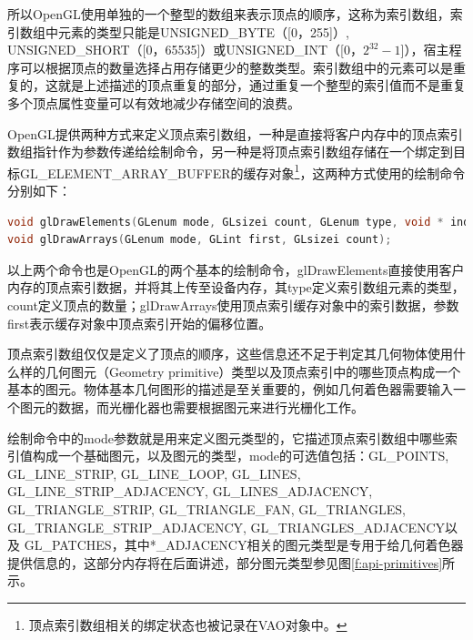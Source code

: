 所以OpenGL使用单独的一个整型的数组来表示顶点的顺序，这称为索引数组，索引数组中元素的类型只能是UNSIGNED\_BYTE（[0，255]）, UNSIGNED\_SHORT（[0，65535]）或UNSIGNED\_INT（[0，$2^{32}-1$]），宿主程序可以根据顶点的数量选择占用存储更少的整数类型。索引数组中的元素可以是重复的，这就是上述描述的顶点重复的部分，通过重复一个整型的索引值而不是重复多个顶点属性变量可以有效地减少存储空间的浪费。

OpenGL提供两种方式来定义顶点索引数组，一种是直接将客户内存中的顶点索引数组指针作为参数传递给绘制命令，另一种是将顶点索引数组存储在一个绑定到目标GL\_ELEMENT\_ARRAY\_BUFFER的缓存对象\footnote{顶点索引数组相关的绑定状态也被记录在VAO对象中。}，这两种方式使用的绘制命令分别如下：

\begin{lstlisting}[language=C++]
void glDrawElements​(GLenum mode​, GLsizei count​, GLenum type​, void * indices​);
void glDrawArrays​(GLenum mode​, GLint first​, GLsizei count​);
\end{lstlisting}

以上两个命令也是OpenGL的两个基本的绘制命令，glDrawElements直接使用客户内存的顶点索引数据，并将其上传至设备内存，其type定义索引数组元素的类型，count定义顶点的数量；glDrawArrays使用顶点索引缓存对象中的索引数据，参数first表示缓存对象中顶点索引开始的偏移位置。

顶点索引数组仅仅是定义了顶点的顺序，这些信息还不足于判定其几何物体使用什么样的几何图元（Geometry primitive）类型以及顶点索引中的哪些顶点构成一个基本的图元。物体基本几何图形的描述是至关重要的，例如几何着色器需要输入一个图元的数据，而光栅化器也需要根据图元来进行光栅化工作。

绘制命令中的mode参数就是用来定义图元类型的，它描述顶点索引数组中哪些索引值构成一个基础图元，以及图元的类型，mode的可选值包括：GL\_POINTS, GL\_LINE\_STRIP, GL\_LINE\_LOOP, GL\_LINES, GL\_LINE\_STRIP\_ADJACENCY, GL\_LINES\_ADJACENCY, GL\_TRIANGLE\_STRIP, GL\_TRIANGLE\_FAN, GL\_TRIANGLES, GL\_TRIANGLE\_STRIP\_ADJACENCY, GL\_TRIANGLES\_ADJACENCY以及 GL\_PATCHES，其中*\_ADJACENCY相关的图元类型是专用于给几何着色器提供信息的，这部分内存将在后面讲述，部分图元类型参见图\ref{f:api-primitives}所示。

